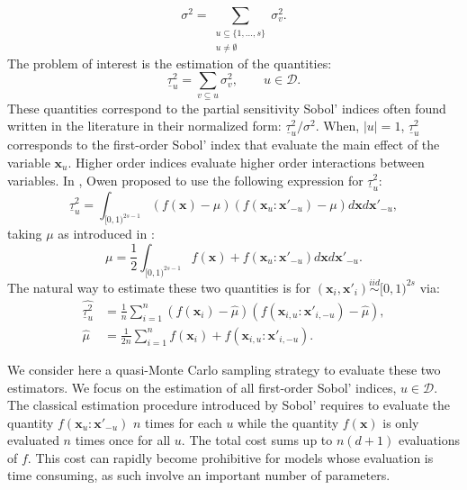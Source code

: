 \documentclass[]{elsarticle}
\theoremstyle{definition}
\newcommand{\bvec}[1]{\boldsymbol{#1}}
\newcommand{\vx}{\bvec{x}}
\begin{document}
\[ \sigma^2 = \sum_{\substack{u \subseteq \{1,\dots,s\} \\ u \neq \emptyset}} \sigma_v^2.\]
The problem of interest is the estimation of the quantities:
\[\underline{\tau}_u^2 = \sum \limits_{v \subseteq u} \sigma_v^2, \qquad u \in \mathcal{D}.\]
These quantities correspond to the partial sensitivity Sobol' indices \cite{sobol} often found written in the literature in their normalized form: $\underline{\tau}_u^2/\sigma^2$. When, $|u|=1$, $\underline{\tau}_u^2$ corresponds to the first-order Sobol' index that evaluate the main effect of the variable $\vx_u$. Higher order indices evaluate higher order interactions between variables. In \cite{owen}, Owen proposed to use the following expression for $\underline{\tau}_u^2$:
\begin{equation}\label{first_order_indice}
\underline{\tau}_u^2  =\int_{[0,1)^{2s-1}}(f(\vx) - \mu) (f(\vx_u:{\vx'}_{-u})-\mu) d\vx d{\vx'}_{-u},
\end{equation}
taking $\mu$ as introduced in \cite{monod,janon}:
\[\mu= \frac{1}{2} \int_{[0,1)^{2s-1}}f(\vx)+f(\vx_u:{\vx'}_{-u}) d\vx d{\vx'}_{-u}. \]
The natural way to estimate these two quantities is for $(\vx_i,\vx'_i) \stackrel{iid}{\sim} [0,1)^{2s}$ via:
\begin{align}
\widehat{\underline{\tau}_u^2} & = \frac{1}{n} \sum \limits_{i=1}^n (f(\vx_i) - \widehat{\mu}) (f(\vx_{i,u}:{\vx'}_{i,-u})-\widehat{\mu}),\label{first_order_indice_estimator}\\
\nonumber
\widehat{\mu} & = \frac{1}{2n} \sum \limits_{i=1}^n f(\vx_i) +f(\vx_{i,u}:{\vx'}_{i,-u}).
\end{align}

We consider here a quasi-Monte Carlo sampling strategy to evaluate these two estimators. We focus on the estimation of all first-order Sobol' indices, $u \in \mathcal{D}$. The classical estimation procedure introduced by Sobol' requires to evaluate the quantity $f(\vx_u:{\vx'}_{-u})$ $n$ times for each $u$ while the quantity $f(\vx)$ is only evaluated $n$ times once for all $u$. The total cost sums up to $n(d+1)$ evaluations of $f$. This cost can rapidly become prohibitive for models whose evaluation is time consuming, as such involve an important number of parameters. 
\end{document}
